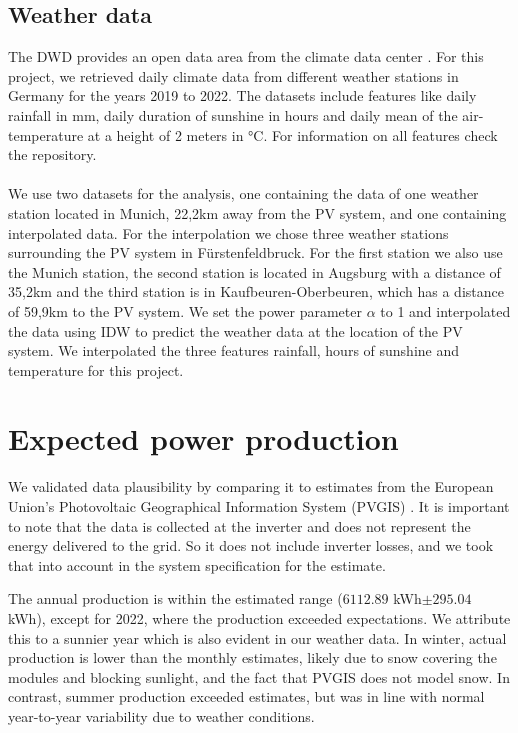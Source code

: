 \documentclass{article}
\begin{document}
\subsection{Weather data}
The DWD provides an open data area from the climate data center \cite{CDC}. 
For this project, we retrieved daily climate data from different weather stations in Germany for the years 2019 to 2022. 
The datasets include features like daily rainfall in mm, daily duration of sunshine in hours and daily mean of the air-temperature at a height of 2 meters in °C. 
For information on all features check the repository. \\ 
\\
We use two datasets for the analysis, one containing the data of one weather station located in Munich, 22,2km away from the PV system, and one containing interpolated data. For the interpolation we chose three weather stations surrounding the PV system in Fürstenfeldbruck. 
For the first station we also use the Munich station, the second station is located in Augsburg with a distance of 35,2km and the third station is in Kaufbeuren-Oberbeuren, which has a distance of 59,9km to the PV system. 
We set the power parameter $\alpha$ to 1 and interpolated the data using IDW to predict the weather data at the location of the PV system. We interpolated the three features rainfall, hours of sunshine and temperature for this project.

\section{Expected power production}\label{sec:methods}

We validated data plausibility by comparing it to estimates from the European Union's Photovoltaic Geographical Information System (PVGIS) \cite{PVGIS}. It is important to note that the data is collected at the inverter and does not represent the energy delivered to the grid. So it does not include inverter losses, and we took that into account in the system specification for the estimate.

The annual production is within the estimated range ($6112.89$ kWh$ \pm 295.04$ kWh), except for 2022, where the production exceeded expectations. We attribute this to a sunnier year \citep{DWD2022} which is also evident in our weather data. In winter, actual production is lower than the monthly estimates, likely due to snow covering the modules and blocking sunlight, and the fact that PVGIS does not model snow. In contrast, summer production exceeded estimates, but was in line with normal year-to-year variability due to weather conditions. 
\end{document}
